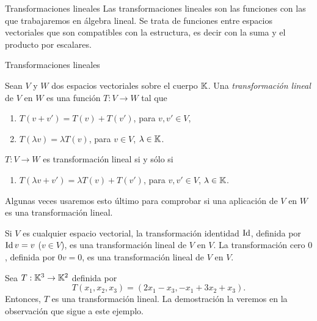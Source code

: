       
    \begin{chapter}{Transformaciones lineales}\label{chap-trans-lin}
        Las transformaciones lineales son las funciones con las que trabajaremos en álgebra lineal. Se trata de funciones entre espacios vectoriales que son compatibles con la estructura,  es decir con la suma y el producto por escalares.
        
        
        \begin{section}{Transformaciones lineales}\label{seccion-transformaciones-lineales}
            \begin{definicion}
                Sean $V$ y $W$ dos espacios vectoriales sobre el cuerpo $\mathbb K$. Una 				\textit{transformación lineal} de $V$ en $W$ es una función $T:V \to W$  tal que
                \begin{enumerate}
                    \item $T(v+v') = T(v)+ T(v')$, para $v,v' \in V$,
                    \item $T(\lambda v) = \lambda T(v)$, para $v \in V$, $\lambda \in \mathbb K$.
                \end{enumerate}
            \end{definicion}
        
            \begin{obs*}
                $T:V \to W$ es transformación lineal si y sólo si
                \begin{enumerate}[label=\textit{\alph*)}, ref=\textit{\alph*)}]
                    \item $T(\lambda v+v') = \lambda T(v)+ T(v')$, para $v,v' \in V$, $\lambda \in \mathbb K$.
                \end{enumerate}
            Algunas veces usaremos esto último para comprobar si una aplicación de $V$ en $W$ es una transformación lineal. 
            \end{obs*}
            
            \begin{ejemplo*}
                Si $V$ es cualquier espacio vectorial, la transformación identidad $\operatorname{Id}$, definida por $\operatorname{Id} v = v$ ($v \in V$), es una transformación lineal de $V$ en $V$. La transformación cero $0$, definida por $0v = 0$, es una transformación lineal de $V$ en $V$.
            \end{ejemplo*}
        
            \begin{ejemplo*}
                Sea $T : \mathbb K^3 \to \mathbb K^2$ definida por
                $$
                T(x_1,x_2,x_3) = (2x_1 - x_3, -x_1+3x_2+x_3).
                $$
                Entonces, $T$  es una transformación lineal. La demostración la veremos en la observación que sigue a este ejemplo. 
                

\end{ejemplo*}
\end{section}
\end{chapter}
